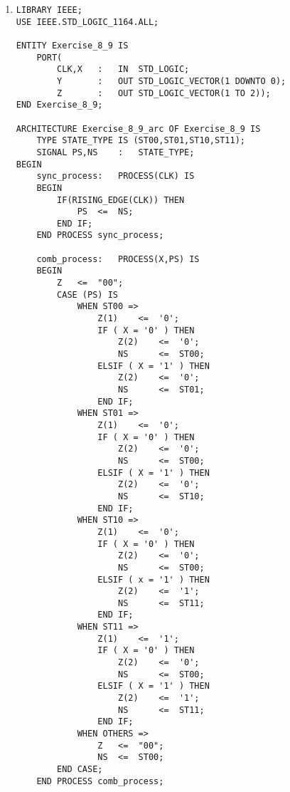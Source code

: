 \begin{enumerate}
\begin{lstlisting}
	comb_process:	PROCESS(X,PS) IS
	BEGIN
		Z	<=	"00";
		CASE (PS) IS
			WHEN ST000 =>
				Z	<=	"00";
				IF ( X = '0' ) THEN
					NS	<=	ST000;
				ELSIF ( X = '1' ) THEN
					NS	<=	ST001;
				END IF;
			WHEN ST001 =>
				Z	<=	"00";
				IF ( X = '0' ) THEN
					NS	<=	ST001;
				ELSIF ( X = '1' ) THEN
					NS	<=	ST010;
				END IF;
			WHEN ST010 =>
				Z	<=	"00";
				IF ( X = '0' ) THEN
					NS	<=	ST010;
				ELSIF ( X = '1' ) THEN
					NS	<=	ST011;
				END IF;
			WHEN ST011 =>
				Z	<=	"10";
				IF ( X = '0' ) THEN
					NS	<=	ST011;
				ELSIF ( X = '1' ) THEN
					NS	<= ST100;
				END IF;
			WHEN ST100 =>
				Z	<=	"01";
				If ( X = '0' ) THEN
					NS	<=	ST000;
				ELSIF ( X = '1' ) THEN
					NS	<=	ST101;
				END IF;
			WHEN ST101 =>
				Z	<=	"11";
				IF ( X = '0' ) THEN
					NS	<=	ST101;
				ELSIF ( X = '1' ) THEN
					NS	<=	ST110;
				END IF;
			WHEN ST110 =>
				Z	<=	"11";
				IF ( X = '0' ) THEN
					NS	<=	ST110;
				ELSIF ( X = '1' ) THEN
					NS	<=	ST111;
				END IF;
			WHEN ST111 =>
				Z	<=	"11";
				IF ( X = '0' ) THEN
					NS	<=	ST111;
				ELSIF ( X = '1' ) THEN
					NS	<=	ST000;
				END IF;
			WHEN OTHERS =>
				Z	<=	"00";
				NS	<=	ST000;
		END CASE;
	END PROCESS comb_process;

		WITH PS SELECT
		Y	<=	"000" WHEN ST000,
				"001" WHEN ST001,
				"010" WHEN ST010,
				"011" WHEN ST011,
				"100" WHEN ST100,
				"101" WHEN ST101,
				"110" WHEN ST110,
				"111" WHEN ST111,
				"000" WHEN OTHERS;
END Exercise_8_8_arc;
	\end{lstlisting}

	\item \begin{lstlisting}
LIBRARY IEEE;
USE IEEE.STD_LOGIC_1164.ALL;

ENTITY Exercise_8_9 IS
	PORT(
		CLK,X	:	IN	STD_LOGIC;
		Y		:	OUT	STD_LOGIC_VECTOR(1 DOWNTO 0);
		Z		:	OUT	STD_LOGIC_VECTOR(1 TO 2));
END Exercise_8_9;

ARCHITECTURE Exercise_8_9_arc OF Exercise_8_9 IS
	TYPE STATE_TYPE IS (ST00,ST01,ST10,ST11);
	SIGNAL PS,NS	:	STATE_TYPE;
BEGIN
	sync_process:	PROCESS(CLK) IS
	BEGIN
		IF(RISING_EDGE(CLK)) THEN
			PS	<=	NS;
		END IF;
	END PROCESS sync_process;

	comb_process:	PROCESS(X,PS) IS
	BEGIN
		Z	<=	"00";
		CASE (PS) IS
			WHEN ST00 =>
				Z(1)	<=	'0';
				IF ( X = '0' ) THEN
					Z(2)	<=	'0';
					NS		<=	ST00;
				ELSIF ( X = '1' ) THEN
					Z(2)	<=	'0';
					NS		<=	ST01;
				END IF;
			WHEN ST01 =>
				Z(1)	<=	'0';
				IF ( X = '0' ) THEN
					Z(2)	<=	'0';
					NS		<=	ST00;
				ELSIF ( X = '1' ) THEN
					Z(2)	<=	'0';
					NS		<=	ST10;
				END IF;
			WHEN ST10 =>
				Z(1)	<=	'0';
				IF ( X = '0' ) THEN
					Z(2)	<=	'0';
					NS		<=	ST00;
				ELSIF ( x = '1' ) THEN
					Z(2)	<=	'1';
					NS		<=	ST11;
				END IF;
			WHEN ST11 =>
				Z(1)	<=	'1';
				IF ( X = '0' ) THEN
					Z(2)	<=	'0';
					NS		<=	ST00;
				ELSIF ( X = '1' ) THEN
					Z(2)	<=	'1';
					NS		<=	ST11;
				END IF;
			WHEN OTHERS =>
				Z	<=	"00";
				NS	<=	ST00;
		END CASE;
	END PROCESS comb_process;


\end{lstlisting}
\end{enumerate}
